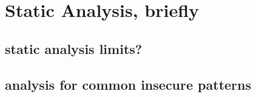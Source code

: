 
\section{Static Analysis, briefly}





\subsection{static analysis limits?}


\subsection{analysis for common insecure patterns}


